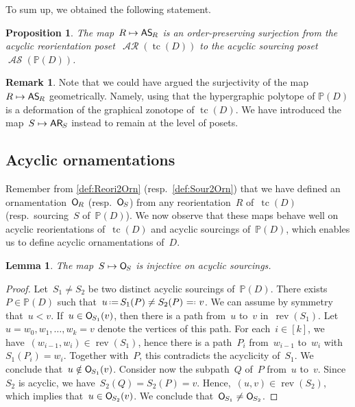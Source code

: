 \documentclass{amsart}
\newtheorem{proposition}[theorem]{Proposition}
\newtheorem{lemma}[theorem]{Lemma}
\theoremstyle{definition}
\newtheorem{remark}[theorem]{Remark}
\renewcommand{\c}[1]{\mathcal{#1}} %
\newcommand{\eqdef}{\mbox{\,\raisebox{0.2ex}{\scriptsize\ensuremath{\mathrm:}}\ensuremath{=}\,}} %
\newcommand{\defeq}{\mbox{~\ensuremath{=}\raisebox{0.2ex}{\scriptsize\ensuremath{\mathrm:}} }} %
\DeclareMathOperator{\tc}{tc} %
\newcommand{\mymap}[2]{\mathsf{#1}_{\hspace{-.7pt}#2}}
\newcommand{\orn}[1]{\mymap{O}{#1}}  %
\DeclareMathOperator{\AReori}{\c{AR}}  %
\newcommand{\areori}[1]{\mymap{AR}{#1}}  %
\DeclareMathOperator{\rev}{rev} %
\DeclareMathOperator{\ASour}{\mathcal{AS}}  %
\newcommand{\asour}[1]{\mymap{AS}{#1}}  %
\newcommand{\PP}{\mathbb P} %
\begin{document}
To sum up, we obtained the following statement.

\begin{proposition}
\label{prop:AReori2ASour}
The map~$R \mapsto \asour{R}$ is an order-preserving surjection from the acyclic reorientation poset~$\AReori(\tc(D))$ to the acyclic sourcing poset~$\ASour(\PP(D))$.
\end{proposition}

\begin{remark}
Note that we could have argued the surjectivity of the map~$R \mapsto \asour{R}$ geometrically.
Namely, using that the hypergraphic polytope of $\PP(D)$ is a deformation of the graphical zonotope of $\tc(D)$.
We have introduced the map~$S \mapsto \areori{S}$ instead to remain at the level of posets.
\end{remark}


\subsection{Acyclic ornamentations}
\label{subsec:acyclicOrnamentations}

Remember from \cref{def:Reori2Orn} (resp.~\cref{def:Sour2Orn}) that we have defined an ornamentation~$\orn{R}$ (resp.~$\orn{S}$) from any reorientation~$R$ of~$\tc(D)$ (resp.~sourcing~$S$ of~$\PP(D)$).
We now observe that these maps behave well on acyclic reorientations of~$\tc(D)$ and acyclic sourcings of~$\PP(D)$, which enables us to define acyclic ornamentations of~$D$.

\begin{lemma}
\label{lem:ASour2AOrn1}
The map~$S \mapsto \orn{S}$ is injective on acyclic sourcings.
\end{lemma}

\begin{proof}
Let~$S_1 \ne S_2$ be two distinct acyclic sourcings of~$\PP(D)$.
There exists~$P \in \PP(D)$ such that~$u \eqdef S_1(P) \ne S_2(P) \defeq v$.
We can assume by symmetry that~$u < v$.
If~$u \in \orn{S_1}(v)$, then there is a path from~$u$ to~$v$ in~$\rev(S_1)$.
Let~$u = w_0, w_1, \dots, w_k = v$ denote the vertices of this path.
For each~$i \in [k]$, we have~$(w_{i-1},w_i) \in \rev(S_1)$, hence there is a path~$P_i$ from~$w_{i-1}$ to~$w_i$ with~$S_1(P_i) = w_i$.
Together with~$P$, this contradicts the acyclicity of~$S_1$.
We conclude that~${u \notin \orn{S_1}(v)}$.
Consider now the subpath~$Q$ of~$P$ from~$u$ to~$v$.
Since~$S_2$ is acyclic, we have~$S_2(Q) = S_2(P) = v$.
Hence,~$(u,v) \in \rev(S_2)$, which implies that~$u \in \orn{S_2}(v)$.
We conclude that~$\orn{S_1} \ne \orn{S_2}$.
\end{proof}
\end{document}
